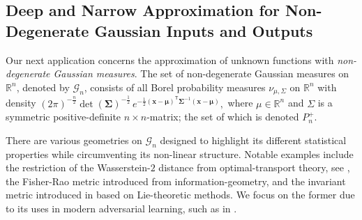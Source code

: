 \documentclass[anon,12pt]{colt2021} %
\newcommand{\rr}{{\mathbb{R}}}
\newcommand{\rrflex}[1]{{\ensuremath{\rr^{#1}
}}}
\newcommand{\rrn}{{\rrflex{n}}}
\renewcommand{\ggg}{{\mathscr{G}}}
\begin{document}
\subsection{Deep and Narrow Approximation for Non-Degenerate Gaussian Inputs and Outputs}\label{ss_EucGaussian} 
Our next application concerns the approximation of unknown functions with \textit{non-degenerate Gaussian measures}.   The set of non-degenerate Gaussian measures on $\rrn$, denoted by $\ggg_n$, consists of all Borel probability measures $\nu_{\mu,\Sigma}$ on $\rrn$ with density 
$ %
(2\pi)^{-\frac{n}{2}}\det(\boldsymbol\Sigma)^{-\frac{1}{2}} \, e^{ -\frac{1}{2}(\mathbf{x} - \boldsymbol\mu)^{{{\!\mathsf{T}}}} \boldsymbol\Sigma^{-1}(\mathbf{x} - \boldsymbol\mu) }
, 
$ %
where $\mu \in \rrn$ and $\Sigma$ is a symmetric positive-definite $n\times n$-matrix; the set of which is denoted $P_n^+$.  


There are various geometries on $\ggg_n$ designed to highlight its different statistical properties while circumventing its non-linear structure.  Notable examples include the restriction of the Wasserstein-$2$ distance from optimal-transport theory, see \cite{VillaniOptTrans}, the Fisher-Rao metric introduced \cite{FisherRaoOriginal1945} from information-geometry, and the invariant metric introduced in \cite{GeometryOfMultivariateNormal_Lie_Canada} based on Lie-theoretic methods.  We focus on the former due to its uses in modern adversarial learning, such as in \cite{pmlrv70arjovsky17a,WGANTrainingNIPS2017892c3b1c}.
	
\end{document}
